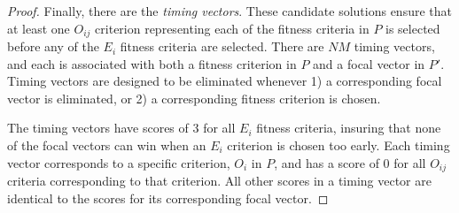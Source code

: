 \documentclass[sigconf]{acmart}
\begin{document}
\begin{proof}
\vspace{2em}

Finally, there are the \textit{timing vectors}. These candidate solutions ensure that at least one $O_{ij}$ criterion representing each of the fitness criteria in $P$ is selected before any of the $E_i$ fitness criteria are selected. There are $NM$ timing vectors, and each is associated with both a fitness criterion in $P$ and a focal vector in $P'$. Timing vectors are designed to be eliminated whenever 1) a corresponding focal vector is eliminated, or 2) a corresponding fitness criterion is chosen.

The timing vectors have scores of 3 for all $E_i$ fitness criteria, insuring that none of the focal vectors can win when an $E_i$ criterion is chosen too early. Each timing vector corresponds to a specific criterion, $O_i$ in $P$, and has a score of 0 for all $O_{ij}$ criteria corresponding to that criterion. All other scores in a timing vector are identical to the scores for its corresponding focal vector.






\end{proof}
\end{document}

